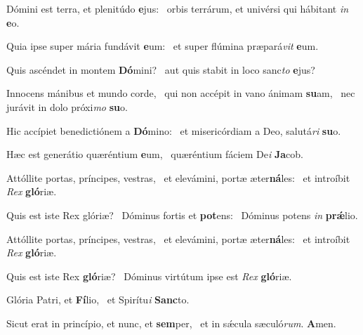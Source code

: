 \item Dómini est terra, et plenitúdo \textbf{e}jus:~\psstar{} orbis terrárum, et univérsi qui hábitant \textit{in} \textbf{e}o.
\item Quia ipse super mária fundávit \textbf{e}um:~\psstar{} et super flúmina præpará\textit{vit} \textbf{e}um.
\item Quis ascéndet in montem \textbf{Dó}mini?~\psstar{} aut quis stabit in loco sanc\textit{to} \textbf{e}jus?
\item Innocens mánibus et mundo corde,~\pscross{} qui non accépit in vano ánimam \textbf{su}am,~\psstar{} nec jurávit in dolo próxi\textit{mo} \textbf{su}o.
\item Hic accípiet benedictiónem a \textbf{Dó}mino:~\psstar{} et misericórdiam a Deo, salutá\textit{ri} \textbf{su}o.
\item Hæc est generátio quæréntium \textbf{e}um,~\psstar{} quæréntium fáciem De\textit{i} \textbf{Ja}cob.
\item Attóllite portas, príncipes, vestras,~\pscross{} et elevámini, portæ æter\textbf{ná}les:~\psstar{} et introíbit \textit{Rex} \textbf{gló}riæ.
\item Quis est iste Rex glóriæ?~\pscross{} Dóminus fortis et \textbf{pot}ens:~\psstar{} Dóminus potens \textit{in} \textbf{prǽ}lio.
\item Attóllite portas, príncipes, vestras,~\pscross{} et elevámini, portæ æter\textbf{ná}les:~\psstar{} et introíbit \textit{Rex} \textbf{gló}riæ.
\item Quis est iste Rex \textbf{gló}riæ?~\psstar{} Dóminus virtútum ipse est \textit{Rex} \textbf{gló}riæ.
\item Glória Patri, et \textbf{Fí}lio,~\psstar{} et Spirítu\textit{i} \textbf{Sanc}to.
\item Sicut erat in princípio, et nunc, et \textbf{sem}per,~\psstar{} et in sǽcula sæculó\textit{rum}. \textbf{A}men.
